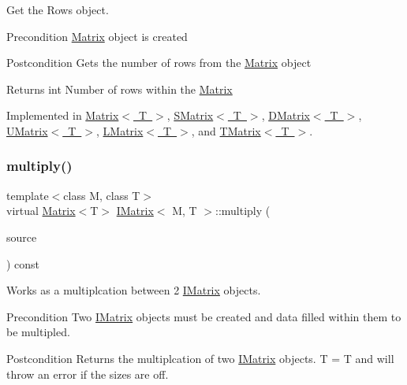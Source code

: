 Get the Rows object. 

\begin{DoxyPrecond}{Precondition}
\mbox{\hyperlink{class_matrix}{Matrix}} object is created 
\end{DoxyPrecond}
\begin{DoxyPostcond}{Postcondition}
Gets the number of rows from the \mbox{\hyperlink{class_matrix}{Matrix}} object 
\end{DoxyPostcond}
\begin{DoxyReturn}{Returns}
int Number of rows within the \mbox{\hyperlink{class_matrix}{Matrix}} 
\end{DoxyReturn}


Implemented in \mbox{\hyperlink{class_matrix_aa665db4bc173a7bb4ec3f9da2676dfa6}{Matrix$<$ T $>$}}, \mbox{\hyperlink{class_s_matrix_ae118c3b246ed5418eadd8f687ec449e2}{S\+Matrix$<$ T $>$}}, \mbox{\hyperlink{class_d_matrix_a0dd457392462f79180d401a09bb5c676}{D\+Matrix$<$ T $>$}}, \mbox{\hyperlink{class_u_matrix_ae261286236cb23a0dfa1296591f4c3ad}{U\+Matrix$<$ T $>$}}, \mbox{\hyperlink{class_l_matrix_ad4ed9d329dbd01d010504a97b3879442}{L\+Matrix$<$ T $>$}}, and \mbox{\hyperlink{class_t_matrix_a93053319a54bdb1dce4271757b996b64}{T\+Matrix$<$ T $>$}}.

\mbox{\label{class_i_matrix_aa4d4f7ce2daec7d68ff8fd590652544d}} 
\subsubsection{\texorpdfstring{multiply()}{multiply()}}
{\footnotesize\ttfamily template$<$class M, class T$>$ \\
virtual \mbox{\hyperlink{class_matrix}{Matrix}}$<$T$>$ \mbox{\hyperlink{class_i_matrix}{I\+Matrix}}$<$ M, T $>$\+::multiply (\begin{DoxyParamCaption}\item[{const \mbox{\hyperlink{class_i_matrix}{I\+Matrix}}$<$ M, T $>$ \&}]{source }\end{DoxyParamCaption}) const\hspace{0.3cm}{\ttfamily [pure virtual]}}



Works as a multiplcation between 2 \mbox{\hyperlink{class_i_matrix}{I\+Matrix}} objects. 

\begin{DoxyPrecond}{Precondition}
Two \mbox{\hyperlink{class_i_matrix}{I\+Matrix}} objects must be created and data filled within them to be multipled. 
\end{DoxyPrecond}
\begin{DoxyPostcond}{Postcondition}
Returns the multiplcation of two \mbox{\hyperlink{class_i_matrix}{I\+Matrix}} objects. T = T and will throw an error if the sizes are off.
\end{DoxyPostcond}

